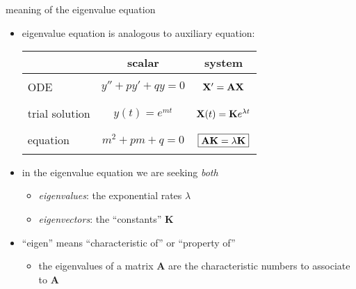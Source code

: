 \documentclass[urlcolor=blue,dvipsnames]{beamer}
\newcommand{\bA}{\mathbf{A}}
\newcommand{\bK}{\mathbf{K}}
\newcommand{\bX}{\mathbf{X}}
\begin{document}
\begin{frame}{meaning of the eigenvalue equation}

\begin{itemize}
\item eigenvalue equation is analogous to auxiliary equation:

\bigskip
\begin{tabular}{l|c|c}
               & scalar & system \\\hline
ODE            & \quad $y''+py'+qy=0$ \quad & $\bX' = \bA\bX \LARGE\strut$ \\ \hline
trial solution & $y(t) = e^{mt}$            & \quad $\bX(t) = \bK e^{\lambda t} \LARGE\strut$ \\ \hline
equation       & $m^2+pm+q=0$               & $\boxed{\bA \bK = \lambda \bK} \LARGE\strut$
\end{tabular}

\bigskip
\item in the eigenvalue equation we are seeking \emph{both}
    \begin{itemize}
    \item \emph{eigenvalues}: the exponential rates $\lambda$
    \item \emph{eigenvectors}: the ``constants'' $\bK$
    \end{itemize}

\medskip
\item ``eigen'' means ``characteristic of'' or ``property of''
    \begin{itemize}
    \item the eigenvalues of a matrix $\bA$ are the characteristic numbers to associate to $\bA$
    \end{itemize}
\end{itemize}
\end{frame}
\end{document}
